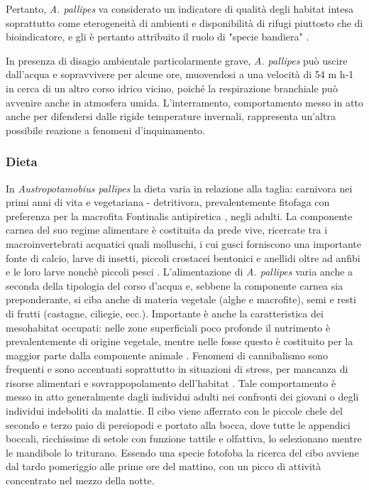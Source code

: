 \documentclass[11pt,a4paper,italian,twoside,openany]{memoir}
\begin{document}
Pertanto, \emph{A. pallipes} va considerato un indicatore di qualità degli habitat intesa soprattutto come eterogeneità di ambienti e disponibilità di rifugi piuttosto che di bioindicatore, e gli è pertanto attribuito il ruolo di "specie bandiera" \cite{Fureder 2003}.

In presenza di disagio ambientale particolarmente grave, \emph{A. pallipes} può uscire dall'acqua e sopravvivere per alcune ore, muovendosi a una velocità di 54 m h-1 \cite{Pond 1975} in cerca di un altro corso idrico vicino, poiché la respirazione branchiale può avvenire anche in atmosfera umida. L'interramento, comportamento messo in atto anche per difendersi dalle rigide temperature invernali, rappresenta un'altra possibile reazione a fenomeni d'inquinamento.

\subsubsection{Dieta}
In \emph{Austropotamobius pallipes} la dieta varia in relazione alla taglia: carnivora nei primi anni di vita e vegetariana - detritivora, prevalentemente fitofaga con preferenza per la macrofita Fontinalis antipiretica \cite{Arrignon 1996}, negli adulti. La componente carnea del suo regime alimentare è costituita da prede vive, ricercate tra i macroinvertebrati acquatici quali molluschi, i cui gusci forniscono una importante fonte di calcio, larve di insetti, piccoli crostacei bentonici e anellidi oltre ad anfibi e le loro larve nonchè piccoli pesci \cite{Mancini 1986}. L'alimentazione di \emph{A. pallipes} varia anche a seconda della tipologia del corso d'acqua e, sebbene la componente carnea sia preponderante, si ciba anche di materia vegetale (alghe e macrofite), semi e resti di frutti (castagne, ciliegie, ecc.). Importante è anche la caratteristica dei mesohabitat occupati: nelle zone superficiali poco profonde il nutrimento è prevalentemente di origine vegetale, mentre nelle fosse questo è costituito per la maggior parte dalla componente animale \cite{Mason 1974}. Fenomeni di cannibalismo sono frequenti e sono accentuati soprattutto in situazioni di stress, per mancanza di risorse alimentari e sovrappopolamento dell'habitat \cite{Elgar 1992}. Tale comportamento è messo in atto generalmente dagli individui adulti nei confronti dei giovani o degli individui indeboliti da malattie. Il cibo viene afferrato con le piccole chele del secondo e terzo paio di pereiopodi e portato alla bocca, dove tutte le appendici boccali, ricchissime di setole con funzione tattile e olfattiva, lo selezionano mentre le mandibole lo triturano. Essendo una specie fotofoba la ricerca del cibo avviene dal tardo pomeriggio alle prime ore del mattino, con un picco di attività concentrato nel mezzo della notte.
\end{document}
